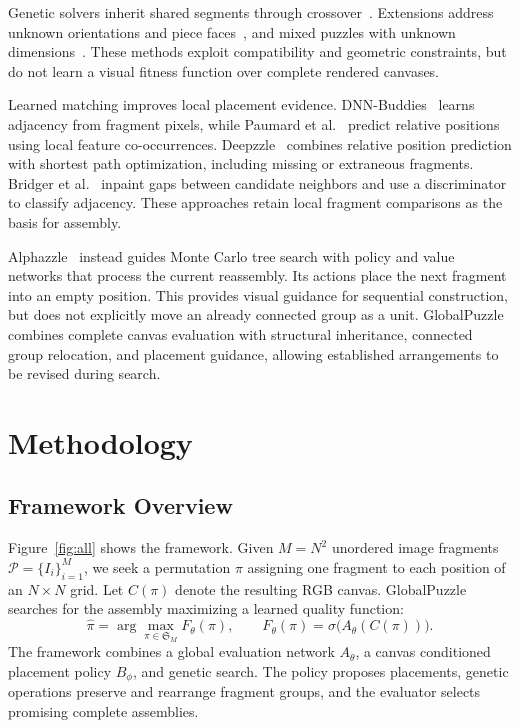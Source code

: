 \documentclass[10pt,twocolumn,letterpaper]{article}
\begin{document}
Genetic solvers inherit shared segments through crossover~\cite{sholomon2013genetic}. Extensions address unknown orientations and piece faces~\cite{sholomon2014generalized}, and mixed puzzles with unknown dimensions~\cite{sholomon2014multiple}. These methods exploit compatibility and geometric constraints, but do not learn a visual fitness function over complete rendered canvases.

Learned matching improves local placement evidence. DNN-Buddies~\cite{sholomon2016dnnbuddies} learns adjacency from fragment pixels, while Paumard et al.~\cite{paumard2018local} predict relative positions using local feature co-occurrences. Deepzzle~\cite{paumard2020deepzzle} combines relative position prediction with shortest path optimization, including missing or extraneous fragments. Bridger et al.~\cite{bridger2020eroded} inpaint gaps between candidate neighbors and use a discriminator to classify adjacency. These approaches retain local fragment comparisons as the basis for assembly.

Alphazzle~\cite{paumard2023alphazzle} instead guides Monte Carlo tree search with policy and value networks that process the current reassembly. Its actions place the next fragment into an empty position. This provides visual guidance for sequential construction, but does not explicitly move an already connected group as a unit. GlobalPuzzle combines complete canvas evaluation with structural inheritance, connected group relocation, and placement guidance, allowing established arrangements to be revised during search.

\section{Methodology}

\subsection{Framework Overview}
\label{sec:overview}

Figure~\ref{fig:all} shows the framework. Given $M=N^2$ unordered image fragments $\mathcal{P}=\{I_i\}_{i=1}^{M}$, we seek a permutation $\pi$ assigning one fragment to each position of an $N\times N$ grid. Let $C(\pi)$ denote the resulting RGB canvas. GlobalPuzzle searches for the assembly maximizing a learned quality function:
\begin{equation}
    \hat\pi=\arg\max_{\pi\in\mathfrak{S}_M}F_\theta(\pi),\qquad
    F_\theta(\pi)=\sigma\bigl(A_\theta(C(\pi))\bigr).
    \label{eq:gp-objective}
\end{equation}
The framework combines a global evaluation network $A_\theta$, a canvas conditioned placement policy $B_\phi$, and genetic search. The policy proposes placements, genetic operations preserve and rearrange fragment groups, and the evaluator selects promising complete assemblies.
\end{document}
